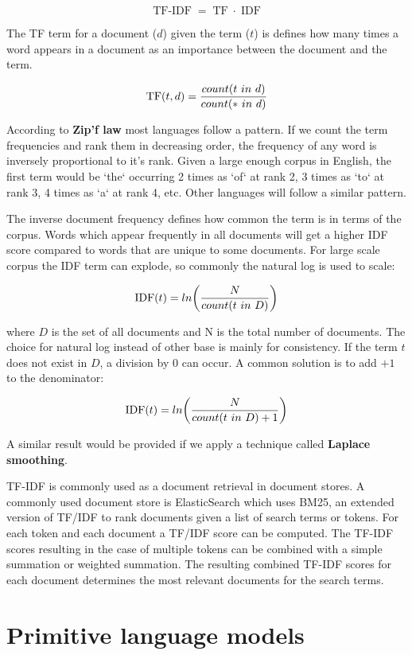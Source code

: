 \[\operatorname{TF-IDF} = \operatorname{TF} \cdot \operatorname{IDF}\]

The TF term for a document (\(d\)) given the term (\(t\)) is defines how many times a word appears in a document as an importance between the document and the term.

\[\operatorname{TF}(t,d) = {count(t\ in\ d) \over {count(*\ in\ d)}}\]

According to \textbf{Zip'f law} most languages follow a pattern. If we count the term frequencies and rank them in decreasing order, the frequency of any word is inversely proportional to it's rank. Given a large enough corpus in English, the first term would be `the` occurring 2 times as `of` at rank 2, 3 times as `to` at rank 3, 4 times as `a` at rank 4, etc. Other languages will follow a similar pattern.

The inverse document frequency defines how common the term is in terms of the corpus. Words which appear frequently in all documents will get a higher IDF score compared to words that are unique to some documents. For large scale corpus the IDF term can explode, so commonly the natural log is used to scale:

\[\operatorname{IDF}(t) = ln\bigg({N \over count(t\ in\ D)}\bigg)\]

where \(D\) is the set of all documents and N is the total number of documents. The choice for natural log instead of other base is mainly for consistency. If the term \(t\) does not exist in \(D\), a division by \(0\) can occur. A common solution is to add \(+1\) to the denominator:

\[\operatorname{IDF}(t) = ln\bigg({N \over count(t\ in\ D)  + 1}\bigg)\]

A similar result would be provided if we apply a technique called \textbf{Laplace smoothing}.

TF-IDF is commonly used as a document retrieval in document stores. A commonly used document store is ElasticSearch which uses BM25, an extended version of TF/IDF to rank documents given a list of search terms or tokens. For each token and each document a TF/IDF score can be computed. The TF-IDF scores resulting in the case of multiple tokens can  be combined with a simple summation or weighted summation. The resulting combined TF-IDF scores for each document determines the most relevant documents for the search terms.

\section{Primitive language models}

